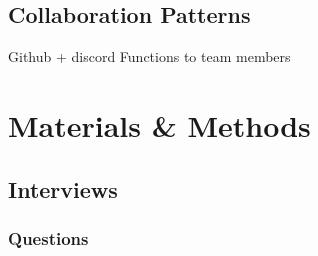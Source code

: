\documentclass[titlepage]{article}
\begin{document}
    \subsection{Collaboration Patterns}
        Github + discord \newline Functions to team members

\section{Materials \& Methods}
        \subsection{Interviews}
            \subsubsection{Questions}
\end{document}
